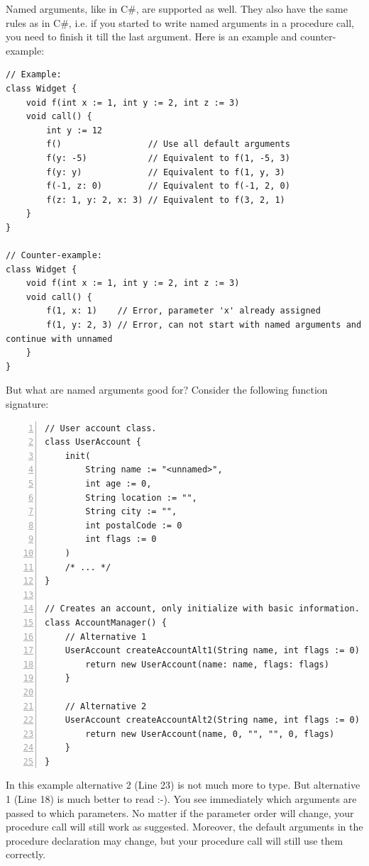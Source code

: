 \documentclass[a5paper]{report}
\def\csharp{\textsc{C\#}\xspace}
\begin{document}
Named arguments, like in \csharp, are supported as well. They also have the same rules as in \csharp,
i.e. if you started to write named arguments in a procedure call, you need to finish it till the last argument.
Here is an example and counter-example:
\begin{lstlisting}
// Example:
class Widget {
    void f(int x := 1, int y := 2, int z := 3)
    void call() {
        int y := 12
        f()                 // Use all default arguments
        f(y: -5)            // Equivalent to f(1, -5, 3)
        f(y: y)             // Equivalent to f(1, y, 3)
        f(-1, z: 0)         // Equivalent to f(-1, 2, 0)
        f(z: 1, y: 2, x: 3) // Equivalent to f(3, 2, 1)
    }
}

// Counter-example:
class Widget {
    void f(int x := 1, int y := 2, int z := 3)
    void call() {
        f(1, x: 1)    // Error, parameter 'x' already assigned
        f(1, y: 2, 3) // Error, can not start with named arguments and continue with unnamed
    }
}
\end{lstlisting}
But what are named arguments good for? Consider the following function signature:
\begin{lstlisting}[numbers=left]
// User account class.
class UserAccount {
    init(
        String name := "<unnamed>",
        int age := 0,
        String location := "",
        String city := "",
        int postalCode := 0
        int flags := 0
    )
    /* ... */
}

// Creates an account, only initialize with basic information.
class AccountManager() {
    // Alternative 1
    UserAccount createAccountAlt1(String name, int flags := 0) {
        return new UserAccount(name: name, flags: flags)
    }
    
    // Alternative 2
    UserAccount createAccountAlt2(String name, int flags := 0) {
        return new UserAccount(name, 0, "", "", 0, flags)
    }
}
\end{lstlisting}
In this example alternative 2 (Line 23) is not much more to type. But alternative 1 (Line 18) is much better to read :-).
You see immediately which arguments are passed to which parameters. No matter if the parameter order will change,
your procedure call will still work as suggested. Moreover, the default arguments in the procedure declaration
may change, but your procedure call will still use them correctly.


\end{document}
